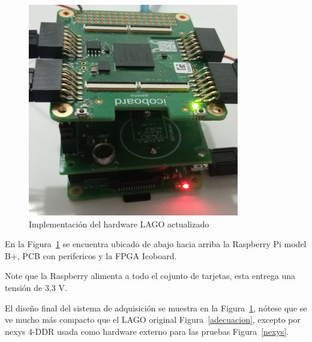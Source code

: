 \begin{figure}[H]
\includegraphics[scale=0.85]{Figs/icoboardfinal.PNG}
\centering
\caption{Implementación del hardware LAGO actualizado}
\label{lagofin}
\end{figure}

En la Figura~\ref{lagofin} se encuentra ubicado de abajo hacia arriba la Raspberry Pi model B+, PCB con perifericos y la FPGA Icoboard.

Note que la Raspberry alimenta a todo el cojunto de tarjetas, esta entrega una tensión de 3,3 V.


El diseño final del sistema de adquisición se muestra en la Figura~\ref{lagofin}, nótese que se ve mucho más compacto  que el LAGO original Figura~\ref{adecuacion}, excepto por nexys 4-DDR usada como hardware externo para las pruebas Figura~\ref{nexys}.

